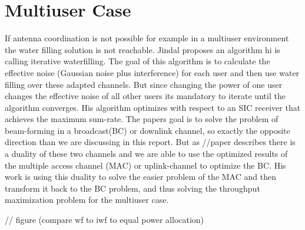 \section{Multiuser Case}
If antenna coordination is not possible for example in a multiuser environment the water filling solution is not reachable. Jindal proposes an algorithm hi is calling iterative waterfilling. The goal of this algorithm is to calculate the effective noise (Gaussian noise plus interference) for each user and then use water filling over these adapted channels. But since changing the power of one user changes the effective noise of all other users its mandatory to iterate until the algorithm converges. His algorithm optimizes with respect to an SIC receiver that achieves the maximum sum-rate.
The papers goal is to solve the problem of beam-forming in a broadcast(BC) or downlink channel, so exactly the opposite direction than we are discussing in this report. But as //paper describes there is a duality of these two channels and we are able to use the optimized results of the multiple access channel (MAC) or uplink-channel to optimize the BC. His work is using this duality to solve the easier problem of the MAC and then transform it back to the BC problem, and thus solving the throughput maximization problem for the multiuser case.

\begin{algorithm}
\end{algorithm}


// figure (compare wf to iwf to equal power allocation)